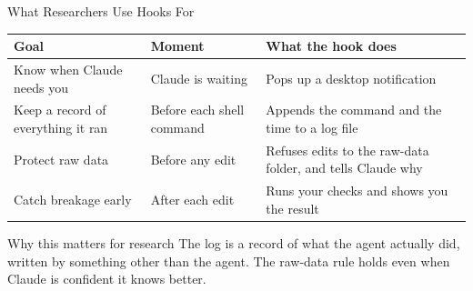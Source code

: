 \documentclass[aspectratio=169, 11pt]{beamer}
\begin{document}
\begin{frame}{What Researchers Use Hooks For}
  \small
  \renewcommand{\arraystretch}{1.3}
  \begin{tabular}{@{}L{0.30\textwidth}L{0.30\textwidth}L{0.34\textwidth}@{}}
    \toprule
    \textbf{Goal} & \textbf{Moment} & \textbf{What the hook does} \\
    \midrule
    Know when Claude needs you & Claude is waiting & Pops up a desktop notification \\[0.2em]
    Keep a record of everything it ran & Before each shell command & Appends the command and the time to a log file \\[0.2em]
    Protect raw data & Before any edit & Refuses edits to the raw-data folder, and tells Claude why \\[0.2em]
    Catch breakage early & After each edit & Runs your checks and shows you the result \\
    \bottomrule
  \end{tabular}

  \vspace{0.8em}
  \begin{alertblock}{Why this matters for research}
    The log is a record of what the agent actually did, written by something other than the agent. The raw-data rule holds even when Claude is confident it knows better.
  \end{alertblock}
\end{frame}
\end{document}
